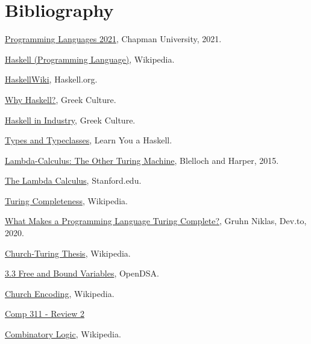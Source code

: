 \documentclass{article}
\begin{document}
\section{Bibliography}
\begin{thebibliography}{99}
 \href{https://github.com/alexhkurz/programming-languages-2021/blob/main/README.md}{Programming Languages 2021}, Chapman University, 2021.

 \href{https://en.wikipedia.org/wiki/Haskell_(programming_language)}{Haskell (Programming Language)}, Wikipedia.

 \href{https://wiki.haskell.org/Introduction}{HaskellWiki}, Haskell.org.

 \href{https://medium.com/geekculture/why-haskell-a9117c42da12}{Why Haskell?}, Greek Culture.

 \href{https://wiki.haskell.org/Haskell_in_industry}{Haskell in Industry}, Greek Culture.

 \href{http://learnyouahaskell.com/types-and-typeclasses#believe-the-type}{Types and Typeclasses}, Learn You a Haskell.

 \href{https://www.cs.cmu.edu/~rwh/talks/cs50talk.pdf}{Lambda-Calculus: The Other Turing Machine}, Blelloch and Harper, 2015.

 \href{https://plato.stanford.edu/entries/lambda-calculus/}{The Lambda Calculus}, Stanford.edu.

 \href{https://en.wikipedia.org/wiki/Turing_completeness}{Turing Completeness}, Wikipedia.

 \href{https://dev.to/gruhn/what-makes-a-programming-language-turing-complete-58fl}{What Makes a Programming Language Turing Complete?}, Gruhn Niklas, Dev.to, 2020.

 \href{https://en.wikipedia.org/wiki/Church-Turing_thesis}{Church-Turing Thesis}, Wikipedia.

 \href{https://opendsa-server.cs.vt.edu/OpenDSA/Books/PL/html/FreeBoundVariables.html}{3.3 Free and Bound Variables}, OpenDSA.

 \href{https://en.wikipedia.org/wiki/Church_encoding}{Church Encoding}, Wikipedia.

 \href{https://www.cs.rice.edu/~javaplt/311/Readings/supplemental.pdf}{Comp 311 - Review 2}

 \href{https://en.wikipedia.org/wiki/Combinatory_logic}{Combinatory Logic}, Wikipedia.


\end{thebibliography}
\end{document}
